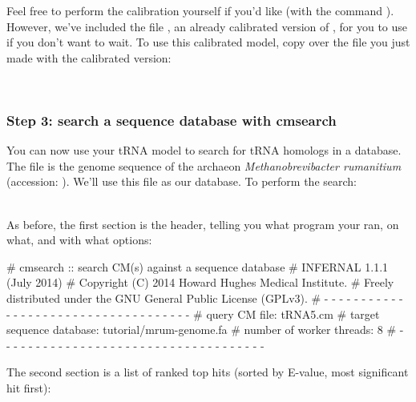 Feel free to perform the calibration yourself if you'd like (with the
command ). However, we've included the file
, an already calibrated version of ,
for you to use if you don't want to wait. To use this calibrated
model, copy over the  file you just made with the
calibrated version:
 
\\
 
\subsubsection{Step 3: search a sequence database with cmsearch}

You can now use your tRNA model to search for tRNA homologs in a
database. The file  is the genome sequence of the
archaeon \emph{Methanobrevibacter rumanitium} (accession:
). We'll use this file as our database. To perform
the search:

\\

As before, the first section is the header, telling you what program
your ran, on what, and with what options:

\begin{sreoutput}
# cmsearch :: search CM(s) against a sequence database
# INFERNAL 1.1.1 (July 2014)
# Copyright (C) 2014 Howard Hughes Medical Institute.
# Freely distributed under the GNU General Public License (GPLv3).
# - - - - - - - - - - - - - - - - - - - - - - - - - - - - - - - - - - - -
# query CM file:                         tRNA5.cm
# target sequence database:              tutorial/mrum-genome.fa
# number of worker threads:              8
# - - - - - - - - - - - - - - - - - - - - - - - - - - - - - - - - - - - -
\end{sreoutput}

The second section is a list of ranked top hits (sorted by E-value,
most significant hit first):

